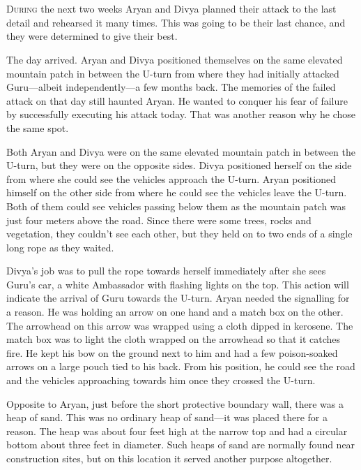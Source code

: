 \chapter{}

\lettrine{D}{uring} the next two weeks Aryan and Divya planned their attack to the last
detail and rehearsed it many times. This was going to be their last chance, and
they were determined to give their best.

The day arrived. Aryan and Divya positioned themselves on the same elevated
mountain patch in between the U-turn from where they had initially attacked
Guru—albeit independently—a few months back. The memories of the failed attack
on that day still haunted Aryan. He wanted to conquer his fear of failure by
successfully executing his attack today. That was another reason why he chose
the same spot.

Both Aryan and Divya were on the same elevated mountain patch in between the
U-turn, but they were on the opposite sides. Divya positioned herself on the
side from where she could see the vehicles approach the U-turn. Aryan positioned
himself on the other side from where he could see the vehicles leave the U-turn.
Both of them could see vehicles passing below them as the mountain patch was
just four meters above the road. Since there were some trees, rocks and
vegetation, they couldn't see each other, but they held on to two ends of a
single long rope as they waited.

Divya's job was to pull the rope towards herself immediately after she sees
Guru's car, a white Ambassador with flashing lights on the top. This action
will indicate the arrival of Guru towards the U-turn. Aryan needed the signalling
for a reason. He was holding an arrow on one hand and a match box on the other.
The arrowhead on this arrow was wrapped using a cloth dipped in kerosene. The
match box was to light the cloth wrapped on the arrowhead so that it catches
fire. He kept his bow on the ground next to him and had a few poison-soaked
arrows on a large pouch tied to his back. From his position, he could see the
road and the vehicles approaching towards him once they crossed the U-turn.

Opposite to Aryan, just before the short protective boundary wall, there was a
heap of sand. This was no ordinary heap of sand—it was placed there for a
reason. The heap was about four feet high at the narrow top and had a circular
bottom about three feet in diameter. Such heaps of sand are normally found near
construction sites, but on this location it served another purpose altogether.

